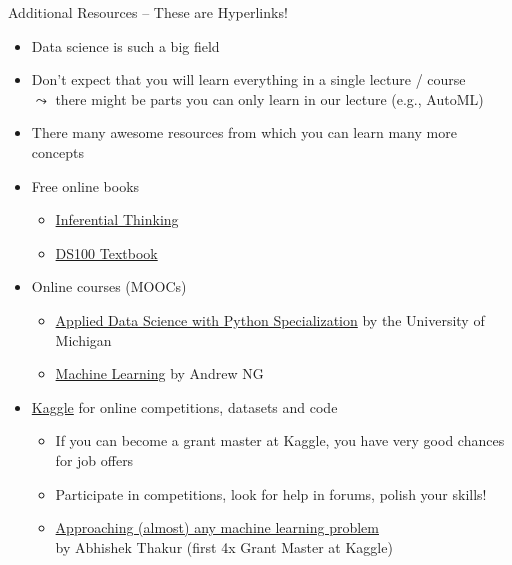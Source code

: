 \documentclass[aspectratio=169]{../latex_main/tntbeamer}  %
\begin{document}
\begin{frame}[c]{Additional Resources -- These are Hyperlinks!}

\begin{itemize} 
  \item Data science is such a big field
  \item Don't expect that you will learn everything in a single lecture / course\\ $\leadsto$ there might be parts you can only learn in our lecture (e.g., AutoML)
  \item There many awesome resources from which you can learn many more concepts
  \pause
  \bigskip
  \item Free online books
  \begin{itemize}
    \item \href{https://inferentialthinking.com/chapters/intro.html}{Inferential Thinking}
      \item \href{https://www.textbook.ds100.org/intro.html}{DS100 Textbook}
\end{itemize}
  \pause
  \item Online courses (MOOCs)
  \begin{itemize}
      \item \href{https://www.coursera.org/specializations/data-science-python}{Applied Data Science with Python Specialization} by the University of Michigan
      \item \href{https://www.coursera.org/learn/machine-learning/home/welcome}{Machine Learning} by Andrew NG
  \end{itemize}
  \pause
  \item \href{https://www.kaggle.com/}{Kaggle} for online competitions, datasets and code
  \begin{itemize}
      \item If you can become a grant master at Kaggle, you have very good chances for job offers
      \item Participate in competitions, look for help in forums, polish your skills!
      \item \href{https://github.com/abhishekkrthakur/approachingalmost}{Approaching (almost) any machine learning problem}\\ by Abhishek Thakur (first 4x Grant Master at Kaggle)
  \end{itemize}
\end{itemize}

\end{frame}
\end{document}
